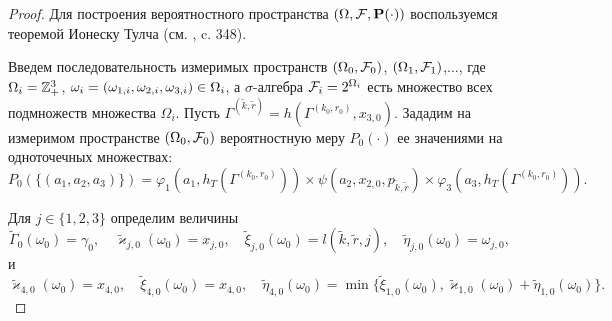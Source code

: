 \documentclass{report}
\begin{document}
\begin{proof}
Для построения вероятностного пространства $(\Omega, {\cal F}, \Pr(\cdot))$ воспользуемся теоремой Ионеску Тулча (см. \cite{Shiryaev}, c. 348). 

Введем последовательность измеримых пространств $(\Omega_0, {\cal F}_0)$, $(\Omega_1, {\cal F}_1)$,$\ldots$, где $\Omega_i\hm=\mathbb{Z}_+^3$, $\omega_i=(\omega_{1,i},\omega_{2,i},\omega_{3,i}) \hm\in \Omega_i$, а $\sigma$-алгебра ${\cal F}_i=2^{\Omega_i}$  есть множество всех подмножеств множества $\Omega_i$. 
Пусть $\Gamma^{(\tilde{k},\tilde{r})}=h(\Gamma^{(k_0,r_0)},x_{3,0})$.
Зададим на измеримом пространстве $(\Omega_0, {\cal F}_0)$ вероятностную меру $P_0(\cdot)$ ее значениями на одноточечных множествах:
\begin{equation}
P_0(\{(a_1,a_2,a_3)\})=\varphi_1(a_1,h_T(\Gamma^{(k_0,r_0)})) \times \psi(a_2,x_{2,0}, p_{\tilde{k},\tilde{r}}) \times \varphi_3(a_3,h_T(\Gamma^{(k_0,r_0)})).
\label{probabilitiesOne}
\end{equation}

Для $j\in \{1,2,3\}$ определим величины
\begin{equation}
\tilde{\Gamma}_0(\omega_0)=\gamma_0, \quad \tilde{\varkappa}_{j,0}(\omega_0)=x_{j,0}, \quad \tilde{\xi}_{j,0}(\omega_0)=l(\tilde{k},\tilde{r},j), \quad \tilde{\eta}_{j,0}(\omega_0)=\omega_{j,0},
\label{startRekOne}
\end{equation}
и
\begin{equation}
 \tilde{\varkappa}_{4,0}(\omega_0)=x_{4,0}, \quad \tilde{\xi}_{4,0}(\omega_0)=x_{4,0}, \quad \tilde{\eta}_{4,0}(\omega_0)=\min\{\tilde{\xi}_{1,0}(\omega_0), \tilde{\varkappa}_{1,0}(\omega_0)+\tilde{\eta}_{1,0}(\omega_0)\}.
\label{startRekTwo}
\end{equation}


\end{proof}
\end{document}
